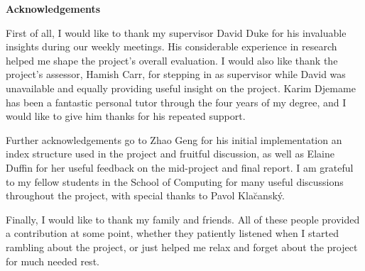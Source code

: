 \begin{center}
    {\LARGE\bf Acknowledgements}
\end{center}

First of all, I would like to thank my supervisor David Duke for his invaluable insights during our weekly meetings. His considerable experience in research helped me shape the project's overall evaluation. I would also like thank the project's assessor, Hamish Carr, for stepping in as supervisor while David was unavailable and equally providing useful insight on the project. Karim Djemame has been a fantastic personal tutor through the four years of my degree, and I would like to give him thanks for his repeated support.

Further acknowledgements go to Zhao Geng for his initial implementation an index structure used in the project and fruitful discussion, as well as Elaine Duffin for her useful feedback on the mid-project and final report. I am grateful to my fellow students in the School of Computing for many useful discussions throughout the project, with special thanks to Pavol Kla\u{c}ansk\'{y}.

Finally, I would like to thank my family and friends. All of these people provided a contribution at some point, whether they patiently listened when I started rambling about the project, or just helped me relax and forget about the project for much needed rest.